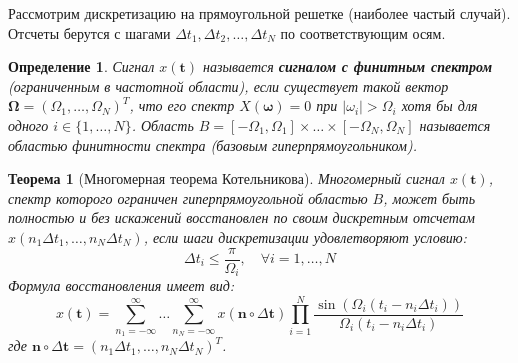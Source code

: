 \documentclass[12pt,a4paper]{article}
\newtheorem{theorem}{Теорема}
\newtheorem{definition}{Определение}
\newcommand{\vect}[1]{\mathbf{#1}}
\begin{document}
Рассмотрим дискретизацию на прямоугольной решетке (наиболее частый случай). Отсчеты берутся с шагами $\Delta t_1, \Delta t_2, \dots, \Delta t_N$ по соответствующим осям.

\begin{definition}
Сигнал $x(\vect{t})$ называется \textbf{сигналом с финитным спектром} (ограниченным в частотной области), если существует такой вектор $\vect{\Omega} = (\Omega_1, \dots, \Omega_N)^T$, что его спектр $X(\vect{\omega}) = 0$ при $|\omega_i| > \Omega_i$ хотя бы для одного $i \in \{1, \dots, N\}$.
Область $B = [-\Omega_1, \Omega_1] \times \dots \times [-\Omega_N, \Omega_N]$ называется областью финитности спектра (базовым гиперпрямоугольником).
\end{definition}

\begin{theorem}[Многомерная теорема Котельникова]
Многомерный сигнал $x(\vect{t})$, спектр которого ограничен гиперпрямоугольной областью $B$, может быть полностью и без искажений восстановлен по своим дискретным отсчетам $x(n_1 \Delta t_1, \dots, n_N \Delta t_N)$, если шаги дискретизации удовлетворяют условию:
\begin{equation}
\Delta t_i \le \frac{\pi}{\Omega_i}, \quad \forall i = 1, \dots, N
\end{equation}
Формула восстановления имеет вид:
\begin{equation}
x(\vect{t}) = \sum_{n_1=-\infty}^{\infty} \dots \sum_{n_N=-\infty}^{\infty} x(\vect{n} \circ \Delta \vect{t}) \prod_{i=1}^N \frac{\sin(\Omega_i (t_i - n_i \Delta t_i))}{\Omega_i (t_i - n_i \Delta t_i)}
\end{equation}
где $\vect{n} \circ \Delta \vect{t} = (n_1 \Delta t_1, \dots, n_N \Delta t_N)^T$.
\end{theorem}
\end{document}
